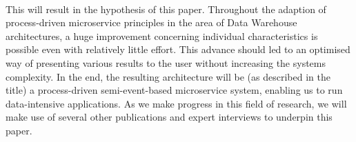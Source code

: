 \\
This will result in the hypothesis of this paper. Throughout the adaption of process-driven microservice principles in the area of Data Warehouse architectures, a huge improvement concerning individual characteristics is possible even with relatively little effort. This advance should led to an optimised way of presenting various results to the user without increasing the systems complexity.\newline 
In the end, the resulting architecture will be (as described in the title) a process-driven semi-event-based microservice system, enabling us to run data-intensive applications. \newline
As we make progress in this field of research, we will make use of several other publications and expert interviews to underpin this paper. 